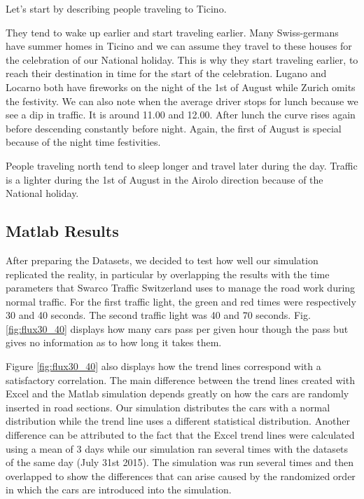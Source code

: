 \documentclass[11pt,a4paper,parskip=half-]{article}
\begin{document}
Let's start by describing people traveling to Ticino. 
\vspace{3mm}






	They tend to wake up earlier and start traveling earlier. Many Swiss-germans have summer homes in Ticino and we can assume they travel to these houses for the celebration of our National holiday. This is why they start traveling earlier, to reach their destination in time for the start of the celebration. Lugano and Locarno both have fireworks on the night of the 1st of August while Zurich omits the festivity. We can also note when the average driver stops for lunch because we see a dip in traffic. It is around 11.00 and 12.00. After lunch the curve rises again before descending constantly before night. Again, the first of August is special because of the night time festivities. 




People traveling north tend to sleep longer and travel later during the day. Traffic is a lighter during the 1st of August in the Airolo direction because of the National holiday. 



















\subsection{Matlab Results} \label{section30_40}

After preparing the Datasets, we decided to test how well our simulation replicated the reality, in particular by overlapping the results with the time parameters that Swarco Traffic Switzerland uses to manage the road work during normal traffic. For the first traffic light, the green and red times were respectively 30 and 40 seconds. The second traffic light was 40 and 70 seconds. Fig. \ref{fig:flux30_40} displays how many cars pass per given hour though the pass but gives no information as to how long it takes them. 

Figure \ref{fig:flux30_40} also displays how the trend lines correspond with a satisfactory correlation. The main difference between the trend lines created with Excel and the Matlab simulation depends greatly on how the cars are randomly inserted in road sections. Our simulation distributes the cars with a normal distribution while the trend line uses a different statistical distribution. Another difference can be attributed to the fact that the Excel trend lines were calculated using a mean of 3 days while our simulation ran several times with the datasets of the same day (July 31st 2015). The simulation was run several times and then overlapped to show the differences that can arise caused by the randomized order in which the cars are introduced into the simulation. 
 
\end{document}
